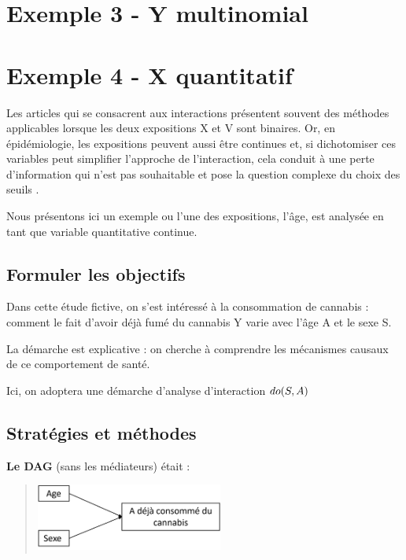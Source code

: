 \documentclass[
]{book}
\begin{document}
\hypertarget{exemple-3---y-multinomial}{%
\chapter{Exemple 3 - Y multinomial}\label{exemple-3---y-multinomial}}

\hypertarget{exemple-4---x-quantitatif}{%
\chapter{Exemple 4 - X quantitatif}\label{exemple-4---x-quantitatif}}

Les articles qui se consacrent aux interactions présentent souvent des méthodes applicables lorsque les deux expositions X et V sont binaires. Or, en épidémiologie, les expositions peuvent aussi être continues et, si dichotomiser ces variables peut simplifier l'approche de l'interaction, cela conduit à une perte d'information qui n'est pas souhaitable et pose la question complexe du choix des seuils \citet{royston2006dichotomizing} \citet{knol2007estimating} \citet{cadarso2006effect}.

Nous présentons ici un exemple ou l'une des expositions, l'âge, est analysée en tant que variable quantitative continue.

\hypertarget{formuler-les-objectifs-1}{%
\section{Formuler les objectifs}\label{formuler-les-objectifs-1}}

Dans cette étude fictive, on s'est intéressé à la consommation de cannabis : comment le fait d'avoir déjà fumé du cannabis Y varie avec l'âge A et le sexe S.

La démarche est explicative : on cherche à comprendre les mécanismes causaux de ce comportement de santé.

Ici, on adoptera une démarche d'analyse d'interaction \(\small do(S,A)\)

\hypertarget{stratuxe9gies-et-muxe9thodes-1}{%
\section{Stratégies et méthodes}\label{stratuxe9gies-et-muxe9thodes-1}}

\textbf{Le DAG} (sans les médiateurs) était :

\begin{quote}
\includegraphics[width=0.5\textwidth,height=\textheight]{img/Image14.png}
\end{quote}
\end{document}
